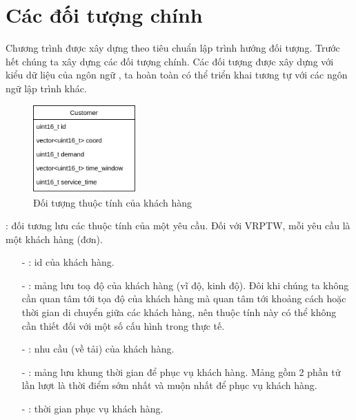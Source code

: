 \section{Các đối tượng chính}
Chương trình được xây dựng theo tiêu chuẩn lập trình hướng đối tượng. Trước hết chúng ta xây dựng các đối tượng chính. Các đối tượng được xây dựng với kiểu dữ liệu của ngôn ngữ , ta hoàn toàn có thể triển khai tương tự với các ngôn ngữ lập trình khác.

\begin{figure}[H] %
  \centering %
  \includegraphics[width=0.35\textwidth]{figures/Customer.png} 
  \caption{Đối tượng thuộc tính của khách hàng} 
  \label{fig:fg_02}
\end{figure}

: đối tương lưu các thuộc tính của một yêu cầu. Đối với VRPTW, mỗi yêu cầu là một khách hàng (đơn).

\begin{itemize}
  \item[-] : id của khách hàng.
  \item[-] : mảng lưu toạ độ của khách hàng (vĩ độ, kinh độ). Đôi khi chúng ta không cần quan tâm tới tọa độ của khách hàng mà quan tâm tới khoảng cách hoặc thời gian di chuyển giữa các khách hàng, nên thuộc tính này có thể không cần thiết đối với một số cấu hình trong thực tế.
  \item[-] : nhu cầu (về tải) của khách hàng.
  \item[-] : mảng lưu khung thời gian để phục vụ khách hàng. Mảng gồm 2 phần tử lần lượt là thời điểm sớm nhất và muộn nhất để phục vụ khách hàng.
  \item[-] : thời gian phục vụ khách hàng.
\end{itemize}


